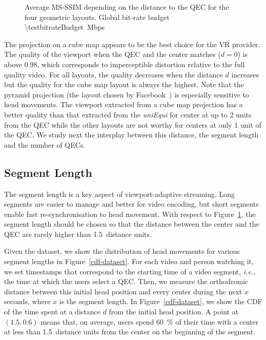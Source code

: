 \begin{figure}
    
       \caption{Average \acs{MS-SSIM} depending on the distance to the \acs{QEC} for the four geometric layouts. Global bit-rate budget \SI{\testbitrateBudget}{\mega bps}}
    \label{fig:dist_quality}
\end{figure}

The projection on a cube map appears to be the best choice for the
\ac{VR} provider. The quality of the viewport when the \ac{QEC} and
the \FoV{} center matches ($d=0$) is above \num{0.98}, which
corresponds to imperceptible distortion relative to the full quality
video. For all layouts, the quality decreases when the distance $d$
increases but the quality for the cube map layout is always the
highest. Note that the pyramid projection (the layout chosen
by Facebook~\cite{facebook}) is especially sensitive to head movements.
The viewport extracted from a cube map projection has a better quality
than that extracted from the \emph{uniEqui} for \FoV{} center at up to
\num{2} units from the \ac{QEC} while the other layouts are not
worthy for \FoV{} centers at only \num{1} unit of the \ac{QEC}.
We study next the interplay between this distance, the segment length and the number of \acp{QEC}.

\subsection{Segment Length}
\label{subsec:segmentLength}

The segment length is a key aspect of viewport-adaptive streaming.
Long segments are easier to manage and better for video encoding, but
short segments enable fast re-synchronisation to head movement. With
respect to Figure~\ref{fig:dist_quality}, the segment length
should be chosen so that the distance between the \FoV{} center and
the \ac{QEC} are rarely higher than \num{1.5}~distance units.

Given the dataset, we show the distribution of head movements for
various segment lengths in Figure~\ref{cdf-dataset}. For each video
and person watching it, we set timestamps that correspond to the
starting time of a video segment, \textit{i.e.,} the time at which the
users select a \ac{QEC}. Then, we measure the orthodromic distance
between this initial head position and every \FoV{} center during
the next $x$ seconds, where $x$ is the segment length. In
Figure~\ref{cdf-dataset}, we show the \ac{CDF} of the time spent at a
distance $d$ from the initial head position.
A point at $(1.5,0.6)$
means that, on average, users spend \SI{60}{\percent} of their time
with a \FoV{} center at less than \num{1.5}~distance units from the
\FoV{} center on the beginning of the segment.

